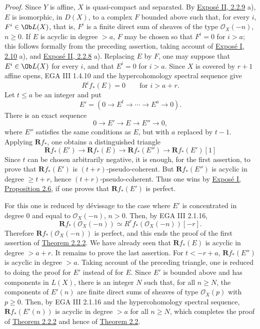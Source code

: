 \emph{Proof.} Since \(Y\) is affine, \(X\) is quasi-compact and separated. By \hyperlink{sga6.e02.prop.2-2-9}{Exposé II, 2.2.9} a), \(E\) is isomorphic, in \(D(X)\), to a complex \(F\) bounded above such that, for every \(i\), \(F^i\in \Ob L(X)\), that is, \(F^i\) is a finite direct sum of sheaves of the type \(\mathcal O_X(-n)\), \(n\geq 0\). If \(E\) is acyclic in degree \(>a\), \(F\) may be chosen so that \(F^i=0\) for \(i>a\); this follows formally from the preceding assertion, taking account of \hyperlink{sga6.e01.prop.2-10}{Exposé I, 2.10} a), and \hyperlink{sga6.e02.thm.2-2-8}{Exposé II, 2.2.8} a). Replacing \(E\) by \(F\), one may suppose that \(E^i\in \Ob L(X)\) for every \(i\), and that \(E^i=0\) for \(i>a\). Since \(X\) is covered by \(r+1\) affine opens, EGA III 1.4.10 and the hypercohomology spectral sequence give
\[
  R^if_*(E)=0\qquad\text{for }i>a+r.
\]
Let \(t\leq a\) be an integer and put
\[
  E'=(0\to E^t\to\cdots\to E^a\to 0).
\]
There is an exact sequence
\[
  0\longrightarrow E'\longrightarrow E\longrightarrow E''\longrightarrow 0,
\]
where \(E''\) satisfies the same conditions as \(E\), but with \(a\) replaced by \(t-1\). Applying \(\mathbf Rf_*\), one obtains a distinguished triangle
\[
\mathbf Rf_*(E')\longrightarrow \mathbf Rf_*(E)\longrightarrow \mathbf Rf_*(E'')\longrightarrow \mathbf Rf_*(E')[1]
\]
Since \(t\) can be chosen arbitrarily negative, it is enough, for the first assertion, to prove that \(\mathbf Rf_*(E')\) is \((t+r)\)-pseudo-coherent. But \(\mathbf Rf_*(E'')\) is acyclic in degree \(\geq t+r\), hence \((t+r)\)-pseudo-coherent. Thus one wins by \hyperlink{sga6.e01.schol.2-6}{Exposé I, Proposition 2.6}, if one proves that \(\mathbf Rf_*(E')\) is perfect.

For this one is reduced by dévissage to the case where \(E'\) is concentrated in degree \(0\) and equal to \(\mathcal O_X(-n)\), \(n>0\). Then, by EGA III 2.1.16,
\[
  \mathbf Rf_*(\mathcal O_X(-n))\simeq R^rf_*(\mathcal O_X(-n))[-r].
\]
Therefore \(\mathbf Rf_*(\mathcal O_X(-n))\) is perfect, and this ends the proof of the first assertion of \hyperlink{sga6.e03.thm.2-2-2}{Theorem 2.2.2}. We have already seen that \(\mathbf Rf_*(E)\) is acyclic in degree \(>a+r\). It remains to prove the last assertion. For \(t<-r+a\), \(\mathbf Rf_*(E'')\) is acyclic in degree \(>a\). Taking account of the preceding triangle, one is reduced to doing the proof for \(E'\) instead of for \(E\). Since \(E'\) is bounded above and has components in \(L(X)\), there is an integer \(N\) such that, for all \(n\geq N\), the components of \(E'(n)\) are finite direct sums of sheaves of type \(\mathcal O_X(p)\) with \(p\geq 0\). Then, by EGA III 2.1.16 and the hypercohomology spectral sequence, \(\mathbf Rf_*(E'(n))\) is acyclic in degree \(>a\) for all \(n\geq N\), which completes the proof of \hyperlink{sga6.e03.thm.2-2-2}{Theorem 2.2.2} and hence of \hyperlink{sga6.e03.thm.2-2}{Theorem 2.2}.

